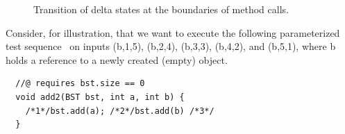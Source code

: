 \documentclass{sig-alternate}
\begin{document}
\subfiguretopcaptrue
\begin{figure}[t]
  \centering
  \begin{small}
    \caption{\label{fig:delta-state}Transition of delta states at the
      boundaries of method calls.}  
  \end{small}
\end{figure}

Consider, for illustration, that we want to execute the following
parameterized test sequence~\cite{tillmann05:parameterized} on inputs
(b,1,5), (b,2,4), (b,3,3), (b,4,2), and (b,5,1), where b holds a
reference to a newly created (empty)  object.

{\small
\noindent
\begin{verbatim}
  //@ requires bst.size == 0
  void add2(BST bst, int a, int b) {
    /*1*/bst.add(a); /*2*/bst.add(b) /*3*/
  }
\end{verbatim}
}
\normalfont
\end{document}

